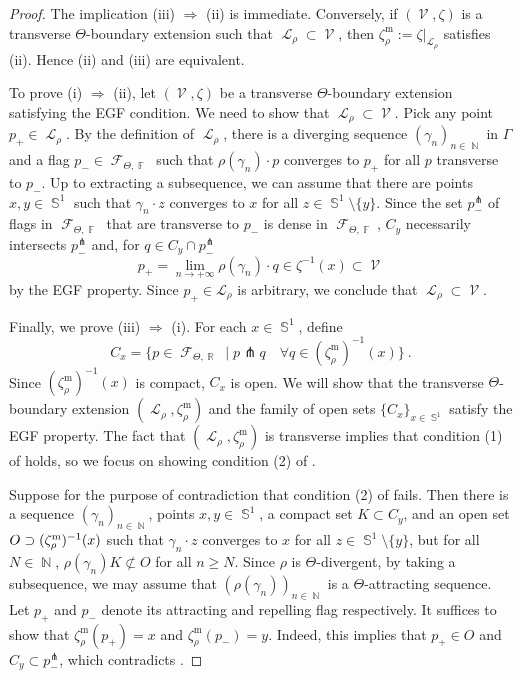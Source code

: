 \documentclass{amsart}
\theoremstyle{plain}
\theoremstyle{definition}
\DeclareMathOperator{\Fc}{\mathcal{F}}
\DeclareMathOperator{\Lc}{\mathcal{L}}
\DeclareMathOperator{\Vc}{\mathcal{V}}
\DeclareMathOperator{\Fb}{{\mathbb{F}}}
\DeclareMathOperator{\Nb}{{\mathbb{N}}}
\DeclareMathOperator{\Rb}{{\mathbb{R}}}
\DeclareMathOperator{\Sb}{\mathbb{S}}
\newcommand{\1}{\mathbf{1}}
\begin{document}
\begin{proof}
The implication (iii) $\Rightarrow$ (ii) is immediate. Conversely, if $(\Vc,\zeta)$ is a transverse $\Theta$-boundary extension such that $\Lc_\rho \subset \Vc$, then $\zeta_\rho^{\mathrm{m}}:=\zeta\vert_{ \Lc_\rho}$ satisfies (ii).
Hence (ii) and (iii) are equivalent.

To prove (i) $\Rightarrow$ (ii), let $(\Vc,\zeta)$ be a transverse $\Theta$-boundary extension satisfying the EGF condition. We need to show that $\Lc_\rho \subset \Vc$. Pick any point $p_+\in\Lc_\rho$. By the definition of $\Lc_\rho$, there is a diverging sequence $(\gamma_n)_{n\in \Nb}$ in $\Gamma$ and a flag $p_-\in\Fc_{\Theta,\Fb}$ such that $\rho(\gamma_n)\cdot p$ converges to $p_+$ for all $p$ transverse to $p_-$. Up to extracting a subsequence, we can assume that there are points $x,y\in\Sb^1$ such that $\gamma_n\cdot z$ converges to $x$ for all $z\in\Sb^1\setminus\{y\}$. Since the set $p_-^\pitchfork$ of flags in $\Fc_{\Theta,\Fb}$ that are transverse to $p_-$ is dense in $\Fc_{\Theta,\Fb}$, $C_y$ necessarily intersects $p_-^\pitchfork$ and, for $q \in C_y \cap p_-^\pitchfork$
\[p_+=\lim_{n\to +\infty} \rho(\gamma_n)\cdot q \in \zeta^{-1}(x) \subset \Vc\]
by the EGF property. Since $p_+\in\mathcal L_\rho$ is arbitrary, we conclude that $\Lc_\rho \subset \Vc$.

Finally, we prove (iii) $\Rightarrow$ (i). For each $x\in\Sb^1$, define \[C_x = \{p\in \Fc_{\Theta,\Rb} \mid p\pitchfork q\quad \forall q\in (\zeta_\rho^{\mathrm{m}})^{-1}(x)\}~.\] 
 Since $(\zeta_\rho^{\mathrm{m}})^{-1}(x)$ is compact, $C_x$ is open. We will show that the transverse $\Theta$-boundary extension $(\Lc_\rho, \zeta_\rho^{\mathrm{m}})$ and the family of open sets $\{C_x\}_{x\in\Sb^1}$ satisfy the EGF property. The fact that $(\Lc_\rho, \zeta_\rho^{\mathrm{m}})$ is transverse implies that condition (1) of  holds, so we focus on showing condition (2) of .

Suppose for the purpose of contradiction that condition (2) of  fails. Then there is a sequence $(\gamma_n)_{n\in \Nb}$, points $x,y\in\Sb^1$, a compact set $K\subset C_y$, and an open set $O\supset(\zeta_\rho^{\rm m})^{-1}(x)$ such that $\gamma_n\cdot z$ converges to $x$ for all $z \in \Sb^1 \setminus \{y\}$, but for all $N\in\Nb$, $\rho(\gamma_n)K\not\subset O$ for all $n\ge N$. Since $\rho$ is $\Theta$-divergent, by taking a subsequence, we may assume that $(\rho(\gamma_n))_{n\in \Nb}$ is a $\Theta$-attracting sequence. Let $p_+$ and $p_-$ denote its  attracting and repelling flag respectively. It suffices to show that $\zeta_\rho^{\mathrm{m}}(p_+)=x$ and $\zeta_\rho^{\mathrm{m}}(p_-)=y$. Indeed, this implies that $p_+\in O$ and $C_y\subset p_-^\pitchfork$, which contradicts .


\end{proof}
\end{document}
